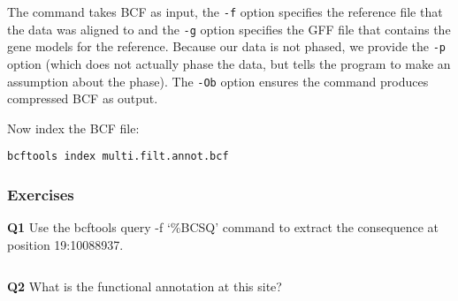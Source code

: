 \documentclass[11pt]{article}
\makeatletter
\newcommand{\boxspacing}{\kern\kvtcb@left@rule\kern\kvtcb@boxsep}
\newcommand{\prompt}[4]{

        {\ttfamily\llap{{\color{blue}\LARGE\faKeyboardO\hspace{3pt}#4}}\vspace{-\baselineskip}}
    }
\makeatother
\begin{document}
    The command takes BCF as input, the \texttt{-f} option specifies the
reference file that the data was aligned to and the \texttt{-g} option
specifies the GFF file that contains the gene models for the reference.
Because our data is not phased, we provide the \texttt{-p} option (which
does not actually phase the data, but tells the program to make an
assumption about the phase). The \texttt{-Ob} option ensures the command
produces compressed BCF as output.

    Now index the BCF file:

    \begin{tcolorbox}[breakable, size=fbox, boxrule=1pt, pad at break*=1mm,colback=cellbackground, colframe=cellborder]
\prompt{In}{incolor}{ }{\boxspacing}
\begin{Verbatim}[commandchars=\\\{\}]
bcftools index multi.filt.annot.bcf
\end{Verbatim}
\end{tcolorbox}

    \hypertarget{exercises}{%
\subsubsection{Exercises}\label{exercises}}

\textbf{Q1} Use the bcftools query -f `\%BCSQ\n' command to extract the
consequence at position 19:10088937.

    \begin{tcolorbox}[breakable, size=fbox, boxrule=1pt, pad at break*=1mm,colback=cellbackground, colframe=cellborder]
\prompt{In}{incolor}{ }{\boxspacing}
\begin{Verbatim}[commandchars=\\\{\}]

\end{Verbatim}
\end{tcolorbox}

    \textbf{Q2} What is the functional annotation at this site?

    \begin{tcolorbox}[breakable, size=fbox, boxrule=1pt, pad at break*=1mm,colback=cellbackground, colframe=cellborder]
\prompt{In}{incolor}{ }{\boxspacing}
\begin{Verbatim}[commandchars=\\\{\}]

\end{Verbatim}
\end{tcolorbox}
\end{document}
